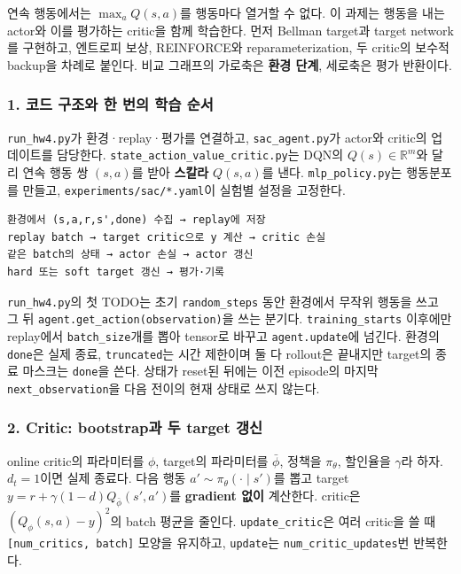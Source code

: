 \documentclass[11pt,a4paper]{article}
\begin{document}
연속 행동에서는 $\max_a Q(s,a)$를 행동마다 열거할 수 없다. 이 과제는 행동을 내는 actor와 이를 평가하는 critic을 함께 학습한다. 먼저 Bellman target과 target network를 구현하고, 엔트로피 보상, REINFORCE와 reparameterization, 두 critic의 보수적 backup을 차례로 붙인다. 비교 그래프의 가로축은 \textbf{환경 단계}, 세로축은 평가 반환이다.\par

\subsubsection{1. 코드 구조와 한 번의 학습 순서}

\texttt{run\_\allowbreak{}hw4.\allowbreak{}py}가 환경·replay·평가를 연결하고, \texttt{sac\_\allowbreak{}agent.\allowbreak{}py}가 actor와 critic의 업데이트를 담당한다. \texttt{state\_\allowbreak{}action\_\allowbreak{}value\_\allowbreak{}critic.\allowbreak{}py}는 DQN의 $Q(s)\in\mathbb R^m$와 달리 연속 행동 쌍 $(s,a)$를 받아 \textbf{스칼라} $Q(s,a)$를 낸다. \texttt{mlp\_\allowbreak{}policy.\allowbreak{}py}는 행동분포를 만들고, \texttt{experiments/sac/*.\allowbreak{}yaml}이 실험별 설정을 고정한다.\par

\begin{verbatim}
환경에서 (s,a,r,s',done) 수집 → replay에 저장
replay batch → target critic으로 y 계산 → critic 손실
같은 batch의 상태 → actor 손실 → actor 갱신
hard 또는 soft target 갱신 → 평가·기록
\end{verbatim}

\texttt{run\_\allowbreak{}hw4.\allowbreak{}py}의 첫 TODO는 초기 \texttt{random\_\allowbreak{}steps} 동안 환경에서 무작위 행동을 쓰고 그 뒤 \texttt{agent.\allowbreak{}get\_\allowbreak{}action(observation)}을 쓰는 분기다. \texttt{training\_\allowbreak{}starts} 이후에만 replay에서 \texttt{batch\_\allowbreak{}size}개를 뽑아 tensor로 바꾸고 \texttt{agent.\allowbreak{}update}에 넘긴다. 환경의 \texttt{done}은 실제 종료, \texttt{truncated}는 시간 제한이며 둘 다 rollout은 끝내지만 target의 종료 마스크는 \texttt{done}을 쓴다. 상태가 reset된 뒤에는 이전 episode의 마지막 \texttt{next\_\allowbreak{}observation}을 다음 전이의 현재 상태로 쓰지 않는다.\par

\subsubsection{2. Critic: bootstrap과 두 target 갱신}

online critic의 파라미터를 $\phi$, target의 파라미터를 $\bar\phi$, 정책을 $\pi_\theta$, 할인율을 $\gamma$라 하자. $d_t=1$이면 실제 종료다. 다음 행동 $a'\sim\pi_\theta(\cdot\mid s')$를 뽑고 target $y=r+\gamma(1-d)Q_{\bar\phi}(s',a')$를 \textbf{gradient 없이} 계산한다. critic은 $(Q_\phi(s,a)-y)^2$의 batch 평균을 줄인다. \texttt{update\_\allowbreak{}critic}은 여러 critic을 쓸 때 \texttt{[num\_\allowbreak{}critics,\allowbreak{} batch]} 모양을 유지하고, \texttt{update}는 \texttt{num\_\allowbreak{}critic\_\allowbreak{}updates}번 반복한다.\par
\end{document}
